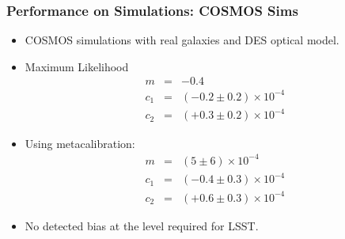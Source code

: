 \documentclass{beamer}
\newcommand{\mcal}{metacalibration}
\begin{document}
\frame
{
    \frametitle{Performance on Simulations: COSMOS Sims}

 
    \begin{itemize}
            
            

         \item COSMOS simulations with real galaxies and DES optical model.

        \item Maximum Likelihood 
            {\color{brightred} 
                \begin{eqnarray}
                    m & = & -0.4  \nonumber \\
                  c_1 & = & (-0.2 \pm 0.2) \times 10^{-4} \nonumber \\
                  c_2 & = & (+0.3 \pm 0.2) \times 10^{-4} \nonumber
                \end{eqnarray}
            }


         \item Using \mcal:
        {\color{gold} 
            \begin{eqnarray}
                m & = & (5 \pm 6) \times 10^{-4} \nonumber \\
              c_1 & = & (-0.4 \pm 0.3) \times 10^{-4} \nonumber \\
              c_2 & = & (+0.6 \pm 0.3) \times 10^{-4} \nonumber
            \end{eqnarray}
        }
         \item No detected bias at the level required for LSST.
    \end{itemize}

}
\end{document}

